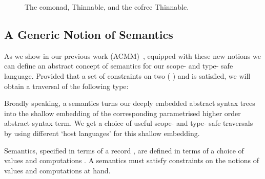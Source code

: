 \begin{figure}[h]
\begin{minipage}{0.45\textwidth}
\end{minipage}\hfill
\begin{minipage}{0.45\textwidth}
\end{minipage}

\begin{minipage}{0.25\textwidth}
\end{minipage}\hfill
\begin{minipage}{0.35\textwidth}
\end{minipage}\hfill
\begin{minipage}{0.30\textwidth}
\end{minipage}

\caption{The  comonad, Thinnable, and the cofree Thinnable.}
\end{figure}

\subsection{A Generic Notion of Semantics}

As we show in our previous work (ACMM)~\citeyear{allais2017type},
equipped with these new notions we can define an abstract concept
of semantics for our scope- and type- safe language. Provided that a set of
constraints on two ({ })  and  is
satisfied, we will obtain a traversal of the following type:


Broadly speaking, a semantics turns our deeply embedded abstract syntax
trees into the shallow embedding of the corresponding parametrised higher
order abstract syntax term. We get a choice of useful scope- and type- safe
traversals by using different `host languages' for this shallow embedding.

Semantics, specified in terms of a record \semrec{}, are defined in terms
of a choice of values  and computations . A semantics must
satisfy constraints on the notions of values  and computations 
at hand.

\label{section:lamsem}

